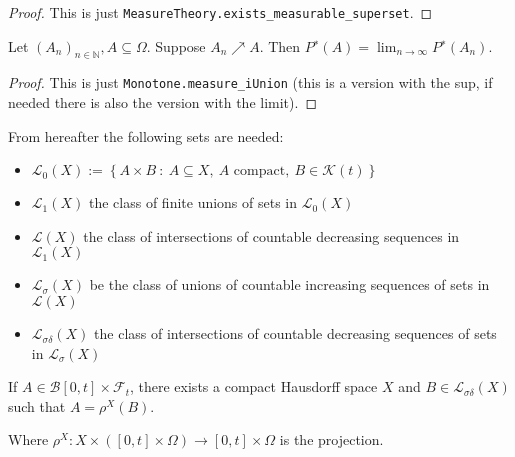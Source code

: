 \begin{proof}\leanok
  This is just \verb|MeasureTheory.exists_measurable_superset|.
\end{proof}

\begin{lemma}\label{lem:aux1b}
Let $(A_n)_{n\in\mathbb{N}},A\subseteq \Omega$.
Suppose $A_n \nearrow A$. Then $P^∗(A) = \lim_{n\rightarrow \infty} P^∗(A_n)$.
\end{lemma}

\begin{proof}\leanok
  This is just \verb|Monotone.measure_iUnion| (this is a version with the sup, if needed there is also the version with the limit).
\end{proof}

\begin{definition}\label{def:L_sets}
  \leanok
  From hereafter the following sets are needed:

  \begin{itemize}
  \item $\mathcal{L}_0(X) := \left\lbrace A \times B\ :\ A \subseteq X ,\ A \text{ compact},\ B \in \mathcal{K}(t)\right\rbrace$
  \item $\mathcal{L}_1(X )$ the class of finite unions of sets in $\mathcal{L}_0(X )$
  \item $\mathcal{L} (X )$ the class of intersections of countable decreasing sequences in $\mathcal{L}_1(X )$
  \item $\mathcal{L}_\sigma(X )$ be the class of unions of countable increasing sequences of sets in $\mathcal{L} (X )$
  \item $\mathcal{L}_{\sigma\delta}(X )$ the class of intersections of countable decreasing sequences of sets in $\mathcal{L}_\sigma(X )$
  \end{itemize}
\end{definition}

\begin{lemma}\label{lem:exists_cpct_Hausdorff}
  \leanok
If $A \in \mathcal{B}[0, t] \times \mathcal{F}_t$, there exists a compact Hausdorff space $X$ and $B \in \mathcal{L}_{\sigma\delta}(X )$ such  that $A = \rho^X (B)$.

Where $\rho^X:X\times ([0,t]\times\Omega)\rightarrow [0,t]\times\Omega$ is the projection.
\end{lemma}

